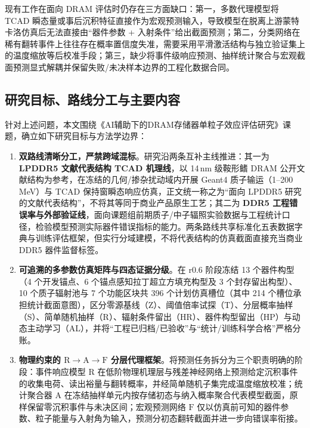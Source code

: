 现有工作在面向 DRAM 评估时仍存在三方面缺口：第一，多数代理模型将 TCAD 瞬态量或事后沉积特征直接作为宏观预测输入，导致模型在脱离上游蒙特卡洛仿真后无法直接由“器件参数 + 入射条件”给出截面预测；第二，分类网络在稀有翻转事件上往往存在概率置信度失准，需要采用平滑激活结构与独立验证集上的温度缩放等后校准手段\cite{elfwing2018silu,guo2017calibration}；第三，缺少将事件级响应预测、抽样统计聚合与宏观截面预测显式解耦并保留失败/未决样本边界的工程化数据合同。

\subsection{研究目标、路线分工与主要内容}
针对上述问题，本文围绕《AI辅助下的DRAM存储器单粒子效应评估研究》课题，确立如下研究目标与方法学边界：

\begin{enumerate}
  \item \textbf{双路线清晰分工，严禁跨域混标}。研究沿两条互补主线推进：其一为 \textbf{LPDDR5 文献代表结构 TCAD 机理线}，以 14\,nm 级鞍形鳍 DRAM 公开文献结构为参考\cite{ryu2025cryogenicdram}，在冻结的几何/掺杂扰动域内开展 Geant4 质子输运（1--200\,MeV）与 TCAD 保持窗瞬态响应仿真，正文统一称之为“面向 LPDDR5 研究的文献代表结构”，不将其等同于商业产品原生工艺；其二为 \textbf{DDR5 工程错误率与外部验证线}，面向课题组前期质子/中子辐照实验数据与工程统计口径，检验模型预测实际器件错误指标的能力。两条路线共享标准化五表数据字典与训练评估框架，但实行分域建模，不将代表结构的仿真截面直接充当商业 DDR5 器件监督标签。
  \item \textbf{可追溯的多参数仿真矩阵与四态证据分级}。在 r0.6 阶段冻结 13 个器件构型（4 个开发锚点、6 个锚点感知拉丁超立方填充构型及 3 个封存留出构型）、10 个质子辐射池与 7 个功能区块共 396 个计划仿真槽位（其中 214 个槽位承担统计截面意图），区分零源基线（Z）、阈值倍率试探（T）、分层概率抽样（S）、简单随机抽样（R）、辐射条件留出（HR）、器件构型留出（HP）与动态主动学习（AL），并将“工程已归档/已验收”与“统计/训练科学合格”严格分账\cite{horvitz1952sampling}。
  \item \textbf{物理约束的 $\mathrm{R}\to\mathrm{A}\to\mathrm{F}$ 分层代理框架}。将预测任务拆分为三个职责明确的阶段：事件响应模型 $\mathrm{R}$ 在低阶物理机理层与残差神经网络上预测给定沉积事件的收集电荷、读出裕量与翻转概率，并经简单随机子集完成温度缩放校准\cite{elfwing2018silu,guo2017calibration}；统计聚合器 $\mathrm{A}$ 在冻结抽样单元内按存储初态与纳入概率聚合代表模型截面，原样保留零沉积事件与未决区间\cite{horvitz1952sampling}；宏观预测网络 $\mathrm{F}$ 仅以仿真前可知的器件参数、粒子能量与入射角为输入，预测分初态翻转截面并进一步向错误率衔接。
\end{enumerate}

